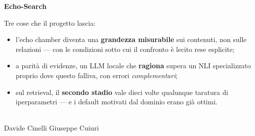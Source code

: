 \documentclass[aspectratio=169,11pt]{beamer}
\begin{document}
{%
\begin{frame}[plain]
  \vfill
  \centering
  {\color{echoink}\textbf{Echo-Search}}\\[0.8em]
  \begin{minipage}{0.82\textwidth}
    \small\color{echoink}
    Tre cose che il progetto lascia:
    \begin{itemize}\small
      \item l'echo chamber diventa una \textbf{grandezza misurabile} sui contenuti, non
            sulle relazioni --- con le condizioni sotto cui il confronto è lecito rese
            esplicite;
      \item a parità di evidenze, un LLM locale che \textbf{ragiona} supera un NLI
            specializzato proprio dove questo falliva, con errori \emph{complementari};
      \item sul retrieval, il \textbf{secondo stadio} vale dieci volte qualunque taratura
            di iperparametri --- e i default motivati dal dominio erano già ottimi.
    \end{itemize}
  \end{minipage}\\[1.2em]
  {\color{echoslate}\small Davide Cinelli \quad\textbar\quad Giuseppe Cuiuri}
  \vfill
\end{frame}
}
\end{document}
